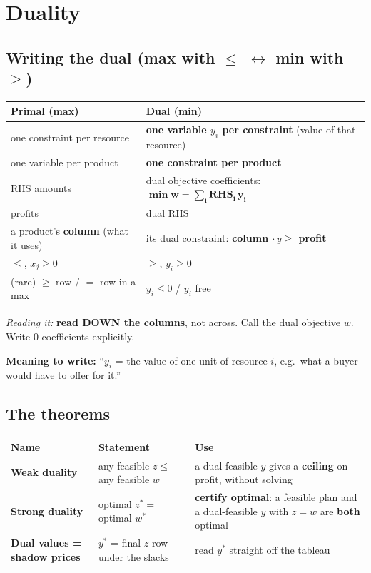 \documentclass[10pt,a4paper]{article}
\newcommand{\reading}[1]{\textit{Reading it:} #1}
\newcommand{\thead}[1]{\textbf{#1}}
\newcommand{\Le}{\ensuremath{\leq}}
\newcommand{\Ge}{\ensuremath{\geq}}
\begin{document}
\section{Duality}

\subsection{Writing the dual (max with \Le{} $\leftrightarrow$ min with \Ge)}

\begin{tabularx}{\linewidth}{@{}l L@{}}
\toprule
\thead{Primal (max)} & \thead{Dual (min)} \\
\midrule
one constraint per resource & \textbf{one variable $y_i$ per constraint} (value of that resource) \\
one variable per product & \textbf{one constraint per product} \\
RHS amounts & dual objective coefficients: $\mathbf{\min w = \sum_i \text{RHS}_i\, y_i}$ \\
profits & dual RHS \\
a product's \textbf{column} (what it uses) & its dual constraint: \textbf{column $\cdot\, y \geq$ profit} \\
\Le, $x_j \geq 0$ & \Ge, $y_i \geq 0$ \\
(rare) \Ge{} row / $=$ row in a max & $y_i \leq 0$ / $y_i$ free \\
\bottomrule
\end{tabularx}

\reading{\textbf{read DOWN the columns}, not across. Call the dual objective $w$. Write 0 coefficients explicitly.}

\textbf{Meaning to write:} ``$y_i$ = the value of one unit of resource $i$, e.g.\ what a buyer would have to offer for it.''

\subsection{The theorems}

\begin{tabularx}{\linewidth}{@{}l l L@{}}
\toprule
\thead{Name} & \thead{Statement} & \thead{Use} \\
\midrule
\textbf{Weak duality} & any feasible $z \leq$ any feasible $w$ & a dual-feasible $y$ gives a \textbf{ceiling} on profit, without solving \\
\textbf{Strong duality} & optimal $z^* = $ optimal $w^*$ & \textbf{certify optimal}: a feasible plan and a dual-feasible $y$ with $z = w$ are \textbf{both} optimal \\
\textbf{Dual values = shadow prices} & $y^*$ = final $z$ row under the slacks & read $y^*$ straight off the tableau \\
\bottomrule
\end{tabularx}
\end{document}
